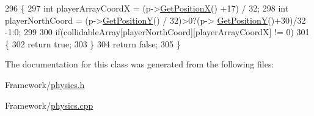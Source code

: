 \begin{DoxyCode}
296 \{
297     \textcolor{keywordtype}{int} playerArrayCoordX = (p->\hyperlink{classPlayerObject_aa84a7779304b680fa32b88b01ba95d02}{GetPositionX}() +17) / 32;
298     \textcolor{keywordtype}{int} playerNorthCoord = (p->\hyperlink{classPlayerObject_ad17b9ec44299f4dc9ca20064c883496b}{GetPositionY}() / 32)>0?(p->
      \hyperlink{classPlayerObject_ad17b9ec44299f4dc9ca20064c883496b}{GetPositionY}()+30)/32 -1:0;
299 
300     \textcolor{keywordflow}{if}(collidableArray[playerNorthCoord][playerArrayCoordX] != 0)
301     \{
302         \textcolor{keywordflow}{return} \textcolor{keyword}{true};
303     \}
304     \textcolor{keywordflow}{return} \textcolor{keyword}{false};
305 \}
\end{DoxyCode}


The documentation for this class was generated from the following files\+:\begin{DoxyCompactItemize}
\item 
Framework/\hyperlink{physics_8h}{physics.\+h}\item 
Framework/\hyperlink{physics_8cpp}{physics.\+cpp}\end{DoxyCompactItemize}
